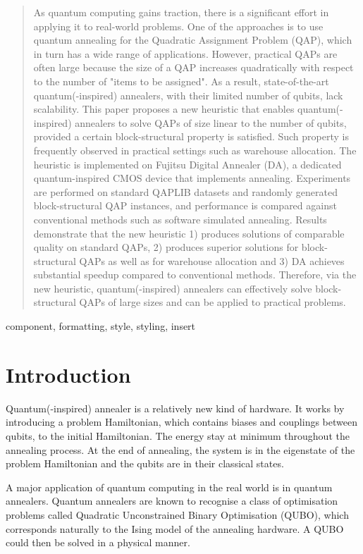 \documentclass[conference]{IEEEtran}
\begin{document}
\begin{abstract}
As quantum computing gains traction, there is a significant effort in applying it to real-world problems. One of the approaches is to use quantum annealing for the Quadratic Assignment Problem (QAP), which in turn has a wide range of applications. However, practical QAPs are often large because the size of a QAP increases quadratically with respect to the number of "items to be assigned". As a result, state-of-the-art quantum(-inspired) annealers, with their limited number of qubits, lack scalability. This paper proposes a new heuristic that enables quantum(-inspired) annealers to solve QAPs of size linear to the number of qubits, provided a certain block-structural property is satisfied. Such property is frequently observed in practical settings such as warehouse allocation. The heuristic is implemented on Fujitsu Digital Annealer (DA), a dedicated quantum-inspired CMOS device that implements annealing. Experiments are performed on standard QAPLIB datasets and randomly generated block-structural QAP instances, and performance is compared against conventional methods such as software simulated annealing. Results demonstrate that the new heuristic 1) produces solutions of comparable quality on standard QAPs, 2) produces superior solutions for block-structural QAPs as well as for warehouse allocation and 3) DA achieves substantial speedup compared to conventional methods. Therefore, via the new heuristic, quantum(-inspired) annealers can effectively solve block-structural QAPs of large sizes and can be applied to practical problems.
\end{abstract}

\begin{IEEEkeywords}
component, formatting, style, styling, insert
\end{IEEEkeywords}

\section{Introduction}
\label{intro}
Quantum(-inspired) annealer is a relatively new kind of hardware. It works by introducing a problem Hamiltonian, which contains biases and couplings between qubits, to the initial Hamiltonian. The energy stay at minimum throughout the annealing process. At the end of annealing, the system is in the eigenstate of the problem Hamiltonian and the qubits are in their classical states.

A major application of quantum computing in the real world is in quantum annealers. Quantum annealers are known to recognise a class of optimisation problems called Quadratic Unconstrained Binary Optimisation (QUBO), which corresponds naturally to the Ising model of the annealing hardware. A QUBO could then be solved in a physical manner.
\end{document}
